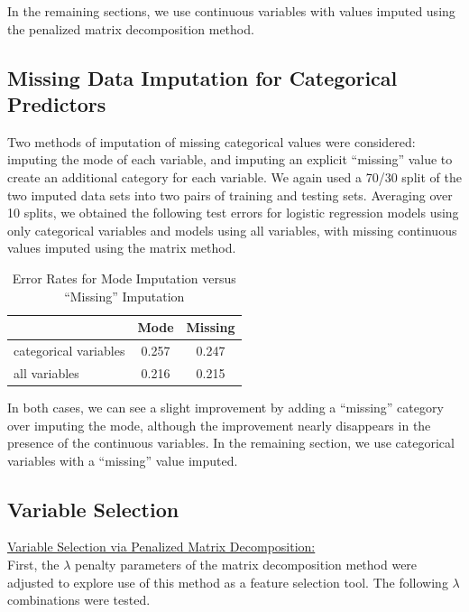 \documentclass{article}
\begin{document}
In the remaining sections, we use continuous variables with values imputed using the penalized matrix decomposition method.

\subsection{Missing Data Imputation for Categorical Predictors}

Two methods of imputation of missing categorical values were considered: imputing the mode of each variable, and imputing an explicit ``missing'' value to create an additional category for each variable.  We again used a 70/30 split of the two imputed data sets into two pairs of training and testing sets.  Averaging over 10 splits, we obtained the following test errors for logistic regression models using only categorical variables and models using all variables, with missing continuous values imputed using the matrix method.
\begin{table}[H]
	\caption{Error Rates for Mode Imputation versus ``Missing'' Imputation}
	\label{Categorical Imputation}
	\centering
	\begin{tabular}{lcc}
		\toprule
								& Mode	& Missing	\\
		\midrule
		categorical variables	& 0.257	& 0.247		\\
		all variables			& 0.216	& 0.215		\\
		\bottomrule
	\end{tabular}
\end{table}
In both cases, we can see a slight improvement by adding a ``missing'' category over imputing the mode, although the improvement nearly disappears in the presence of the continuous variables.  In the remaining section, we use categorical variables with a ``missing'' value imputed.



\subsection{Variable Selection}

\underline{Variable Selection via Penalized Matrix Decomposition:}\\

First, the $\lambda$ penalty parameters of the matrix decomposition method were adjusted to explore use of this method as a feature selection tool.  The following $\lambda$ combinations were tested.
\end{document}
